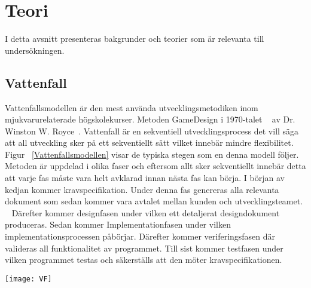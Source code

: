 \section{Teori} \label{sec:Lieth_Wahid-theory}
I detta avsnitt presenteras bakgrunder och teorier som är relevanta till undersökningen. 
\subsection{Vattenfall}
Vattenfallsmodellen är den mest använda utvecklingsmetodiken inom mjukvarurelaterade högskolekurser. Metoden GameDesign i 1970-talet  ~\cite{WaterfalM} av Dr. Winston W. Royce~\cite{managing}. Vattenfall är en sekventiell utvecklingsprocess det vill säga att all utveckling sker på ett sekventiellt sätt vilket innebär mindre flexibilitet. Figur ~\ref{Vattenfallsmodellen} visar de typiska 
stegen som en denna modell följer. Metoden är uppdelad i olika faser och eftersom allt sker sekventiellt innebär detta att varje fas måste vara helt avklarad innan nästa fas kan börja.  I början av kedjan kommer kravspecifikation. Under denna fas genereras alla relevanta dokument som sedan kommer vara avtalet mellan kunden och utvecklingsteamet. ~\cite{GameDesign} Därefter kommer designfasen under vilken ett detaljerat designdokument produceras. Sedan kommer Implementationfasen under vilken implementationsprocessen  påbörjar. Därefter kommer veriferingsfasen där valideras all funktionalitet  av programmet. Till sist kommer testfasen under vilken programmet testas och säkerställs  att den möter kravspecifikationen.
\begin{figure*}[h]
	\centering
	\texttt{[image: VF]}
	\caption[Vattenfallsmodellen]{Vattenfallsmodellen~\cite{theWaterFall}}
	\label{Vattenfallsmodellen}
\end{figure*}

